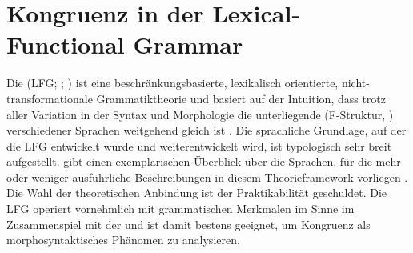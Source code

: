 
\section{Kongruenz in der Lexical-Functional Grammar}
\label{sec:lfgkongr}

Die  (LFG;
\cites{kaplanbresnan1982,bresnan2001,bresnanetal2016}; \cites[zur Einführung
z.\,B.][]{buttking2015}[223--246]{mueller2023}) ist eine
beschränkungsbasierte, lexikalisch orientierte,
nicht-trans\allowbreak{}formationale Grammatiktheorie und basiert auf der
Intuition, dass trotz aller Variation in der Syntax und Morphologie die
unterliegende  (F-Struktur,
) verschiedener Sprachen weitgehend gleich ist
\autocite[42]{bresnanetal2016}.
Die sprachliche Grundlage, auf der die LFG entwickelt wurde und
weiterentwickelt wird, ist typologisch sehr breit aufgestellt.
\citet[223--224]{mueller2023} gibt einen exemplarischen Überblick über die
Sprachen, für die mehr oder weniger ausführliche Beschreibungen in diesem
Theorieframework vorliegen \autocites[zum modernen Standarddeutschen
vgl.][]{berman2003}{fortmann2006}. Die Wahl der theoretischen Anbindung ist der
Praktikabilität geschuldet. Die LFG operiert vornehmlich mit grammatischen
Merkmalen im Sinne  im
Zusammenspiel mit der  und ist damit bestens
geeignet, um Kongruenz als morphosyntaktisches Phänomen zu analysieren.

